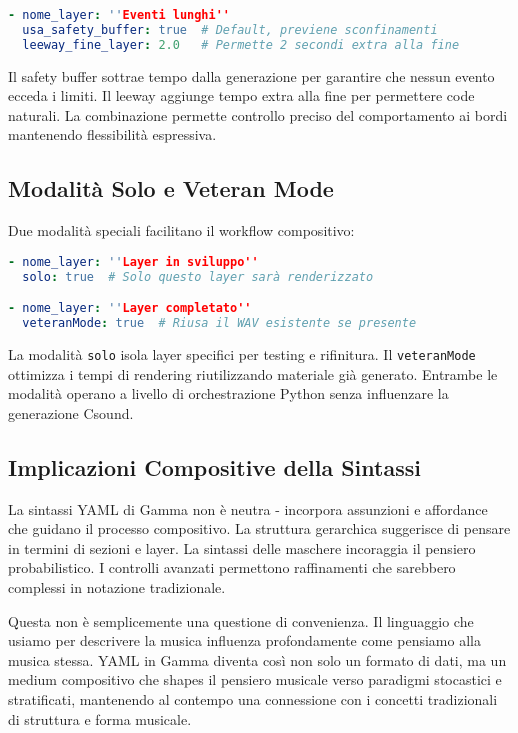 \begin{lstlisting}[language=Yaml]
- nome_layer: ''Eventi lunghi''
  usa_safety_buffer: true  # Default, previene sconfinamenti
  leeway_fine_layer: 2.0   # Permette 2 secondi extra alla fine
\end{lstlisting}

Il safety buffer sottrae tempo dalla generazione per garantire che nessun evento ecceda i limiti. Il leeway aggiunge tempo extra alla fine per permettere code naturali. La combinazione permette controllo preciso del comportamento ai bordi mantenendo flessibilità espressiva.
\subsection{Modalità Solo e Veteran Mode}
Due modalità speciali facilitano il workflow compositivo:

\begin{lstlisting}[language=Yaml]
- nome_layer: ''Layer in sviluppo''
  solo: true  # Solo questo layer sarà renderizzato

- nome_layer: ''Layer completato''
  veteranMode: true  # Riusa il WAV esistente se presente
\end{lstlisting}

La modalità \texttt{solo} isola layer specifici per testing e rifinitura. Il \texttt{veteranMode} ottimizza i tempi di rendering riutilizzando materiale già generato. Entrambe le modalità operano a livello di orchestrazione Python senza influenzare la generazione Csound.
\subsection{Implicazioni Compositive della Sintassi}
La sintassi YAML di Gamma non è neutra - incorpora assunzioni e affordance che guidano il processo compositivo. La struttura gerarchica suggerisce di pensare in termini di sezioni e layer. La sintassi delle maschere incoraggia il pensiero probabilistico. I controlli avanzati permettono raffinamenti che sarebbero complessi in notazione tradizionale.

Questa non è semplicemente una questione di convenienza. Il linguaggio che usiamo per descrivere la musica influenza profondamente come pensiamo alla musica stessa. YAML in Gamma diventa così non solo un formato di dati, ma un medium compositivo che shapes il pensiero musicale verso paradigmi stocastici e stratificati, mantenendo al contempo una connessione con i concetti tradizionali di struttura e forma musicale.